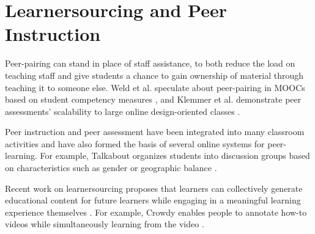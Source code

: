 \section{Learnersourcing and Peer Instruction}

Peer-pairing can stand in place of staff assistance, to both reduce the load on teaching staff and give students a chance to gain ownership of material through teaching it to someone else. Weld et al. speculate about peer-pairing in MOOCs based on student competency measures \cite{WeldHcomp12}, and Klemmer et al. demonstrate peer assessments' scalability to large online design-oriented classes \cite{Klemmer}.

Peer instruction \cite{mazur} and peer assessment \cite{peerassessment} have been integrated into many classroom activities and have also formed the basis of several online systems for peer-learning. For example, Talkabout organizes students into discussion groups based on characteristics such as gender or geographic balance \cite{talkabout}.

Recent work on learnersourcing proposes that learners can collectively generate educational content for future learners while engaging in a meaningful learning experience themselves \cite{kim2013learnersourcing,weir2015,mitros2015}. For example, Crowdy enables people to annotate how-to videos while simultaneously learning from the video \cite{weir2015}.




